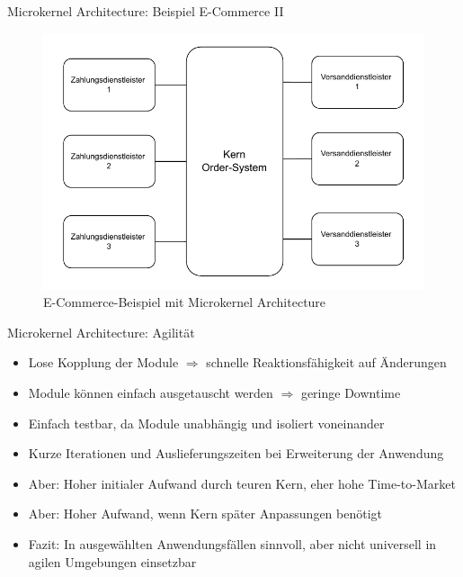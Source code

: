 \begin{frame}{Microkernel Architecture: Beispiel E-Commerce II}
    \begin{figure}[!h]
        \centering
        \includegraphics[scale=0.55]{imglib/microkernel/ecommerce-microkernel}
        \caption{E-Commerce-Beispiel mit Microkernel Architecture}
        \label{fig:microkernel-ecommerce}
    \end{figure}
\end{frame}

\begin{frame}{Microkernel Architecture: Agilität}
    \begin{itemize}
        \item Lose Kopplung der Module $\Rightarrow$ schnelle Reaktionsfähigkeit auf Änderungen
        \item Module können einfach ausgetauscht werden $\Rightarrow$ geringe Downtime
        \item Einfach testbar, da Module unabhängig und isoliert voneinander
        \item Kurze Iterationen und Auslieferungszeiten bei Erweiterung der Anwendung
        \item Aber: Hoher initialer Aufwand durch teuren Kern, eher hohe Time-to-Market
        \item Aber: Hoher Aufwand, wenn Kern später Anpassungen benötigt
        \item Fazit: In ausgewählten Anwendungsfällen sinnvoll, aber nicht universell in agilen Umgebungen einsetzbar
    \end{itemize}
\end{frame}



